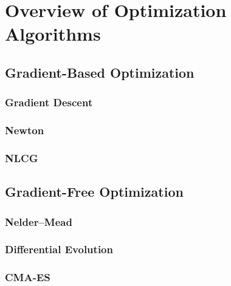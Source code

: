 \section{Overview of Optimization Algorithms}

\blindtext{}

\subsection{Gradient-Based Optimization}

\blindtext{}

\subsubsection{Gradient Descent}

\blindtext{}

\subsubsection{Newton}

\blindtext{}

\subsubsection{NLCG}

\blindtext{}

\subsection{Gradient-Free Optimization}

\blindtext{}

\subsubsection{Nelder--Mead}

\blindtext{}

\subsubsection{Differential Evolution}

\blindtext{}

\subsubsection{CMA-ES}

\blindtext{}
